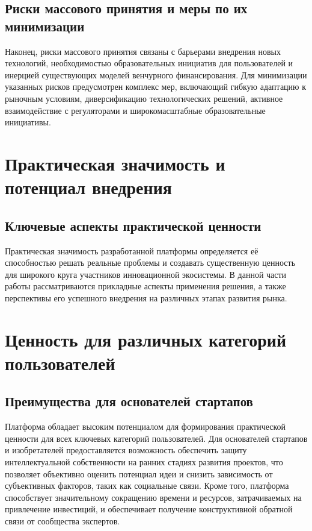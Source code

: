 \documentclass[
    candidate, %
    subf, %
    dotsinheaders=false,
]{disser}
\begin{document}
\subsection{Риски массового принятия и меры по их минимизации}
Наконец, риски массового принятия связаны с барьерами внедрения новых технологий, необходимостью образовательных инициатив для пользователей и инерцией существующих моделей венчурного финансирования. Для минимизации указанных рисков предусмотрен комплекс мер, включающий гибкую адаптацию к рыночным условиям, диверсификацию технологических решений, активное взаимодействие с регуляторами и широкомасштабные образовательные инициативы.

\section{Практическая значимость и потенциал внедрения}

\subsection{Ключевые аспекты практической ценности}
Практическая значимость разработанной платформы определяется её способностью решать реальные проблемы и создавать существенную ценность для широкого круга участников инновационной экосистемы. В данной части работы рассматриваются прикладные аспекты применения решения, а также перспективы его успешного внедрения на различных этапах развития рынка.

\section{Ценность для различных категорий пользователей}

\subsection{Преимущества для основателей стартапов}
Платформа обладает высоким потенциалом для формирования практической ценности для всех ключевых категорий пользователей. Для основателей стартапов и изобретателей предоставляется возможность обеспечить защиту интеллектуальной собственности на ранних стадиях развития проектов, что позволяет объективно оценить потенциал идеи и снизить зависимость от субъективных факторов, таких как социальные связи. Кроме того, платформа способствует значительному сокращению времени и ресурсов, затрачиваемых на привлечение инвестиций, и обеспечивает получение конструктивной обратной связи от сообщества экспертов.
\end{document}
